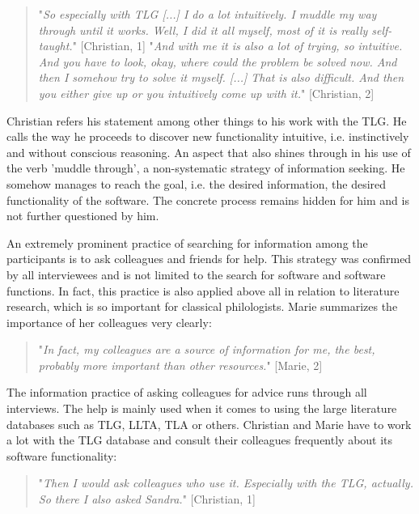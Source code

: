 \documentclass[12pt, a4paper, titlepage, oneside, abstract=true, toc=listof, toc=bibliography]{scrreprt}
\begin{document}
{\begin{quotation}
"\textit{So especially with TLG [...] I do a lot intuitively. I muddle my way through until it works. Well, I did it all myself, most of it is really self-taught.}" [Christian, 1]
"\textit{And with me it is also a lot of trying, so intuitive. And you have to look, okay, where could the problem be solved now. And then I somehow try to solve it myself. [...] That is also difficult. And then you either give up or you intuitively come up with it.}" [Christian, 2]
\end{quotation}

Christian refers his statement among other things to his work with the TLG. He calls the way he proceeds to discover new functionality intuitive, i.e. instinctively and without conscious reasoning. An aspect that also shines through in his use of the verb 'muddle through', a non-systematic strategy of information seeking. He somehow manages to reach the goal, i.e. the desired information, the desired functionality of the software. The concrete process remains hidden for him and is not further questioned by him.

An extremely prominent practice of searching for information among the participants is to ask colleagues and friends for help. This strategy was confirmed by all interviewees and is not limited to the search for software and software functions. In fact, this practice is also applied above all in relation to literature research, which is so important for classical philologists. Marie summarizes the importance of her colleagues very clearly: 

\begin{quotation}
"\textit{In fact, my colleagues are a source of information for me, the best, probably more important than other resources.}" [Marie, 2]
\end{quotation}

The information practice of asking colleagues for advice runs through all interviews. The help is mainly used when it comes to using the large literature databases such as TLG, LLTA, TLA or others. Christian and Marie have to work a lot with the TLG database and consult their colleagues frequently about its software functionality: 

\begin{quotation}
"\textit{Then I would ask colleagues who use it. Especially with the TLG, actually. So there I also asked Sandra.}" [Christian, 1]
\end{quotation}

}
\end{document}
